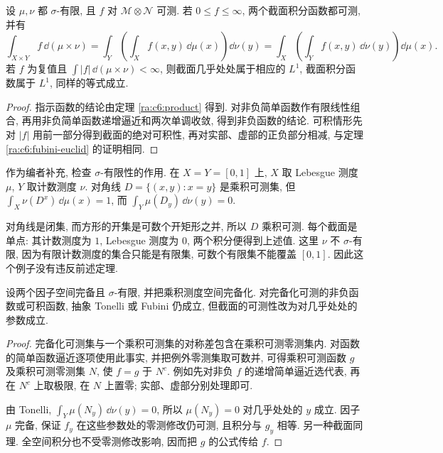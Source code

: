 \begin{theorem}\label{ra:c6:abstract}
设 $\mu,\nu$ 都 $\sigma$-有限, 且 $f$ 对 $\mathcal M\otimes\mathcal N$ 可测.
若 $0\le f\le\infty$, 两个截面积分函数都可测, 并有
\[
 \int_{X\times Y}f\,\dd(\mu\times\nu)
 =\int_Y\left(\int_Xf(x,y)\,\dd\mu(x)\right)\dd\nu(y)
 =\int_X\left(\int_Yf(x,y)\,\dd\nu(y)\right)\dd\mu(x).
\]
若 $f$ 为复值且 $\int|f|\,\dd(\mu\times\nu)<\infty$, 则截面几乎处处属于相应的 $L^1$, 截面积分函数属于 $L^1$, 同样的等式成立.
\end{theorem}
\begin{proof}
指示函数的结论由定理 \ref{ra:c6:product} 得到. 对非负简单函数作有限线性组合, 再用非负简单函数递增逼近和两次单调收敛, 得到非负函数的结论. 可积情形先对 $|f|$ 用前一部分得到截面的绝对可积性, 再对实部、虚部的正负部分相减, 与定理 \ref{ra:c6:fubini-euclid} 的证明相同.
\end{proof}

\begin{example}
作为编者补充, 检查 $\sigma$-有限性的作用. 在 $X=Y=[0,1]$ 上, $X$ 取 Lebesgue 测度 $\mu$, $Y$ 取计数测度 $\nu$. 对角线 $D=\{(x,y):x=y\}$ 是乘积可测集, 但
$\int_X\nu(D^x)\,\dd\mu(x)=1$, 而 $\int_Y\mu(D_y)\,\dd\nu(y)=0$.
\end{example}
\begin{solution}
对角线是闭集, 而方形的开集是可数个开矩形之并, 所以 $D$ 乘积可测. 每个截面是单点: 其计数测度为 $1$, Lebesgue 测度为 $0$, 两个积分便得到上述值. 这里 $\nu$ 不 $\sigma$-有限, 因为有限计数测度的集合只能是有限集, 可数个有限集不能覆盖 $[0,1]$. 因此这个例子没有违反前述定理.
\end{solution}


\begin{proposition}[完备乘积上的截面]\label{ra:c6:completion}
设两个因子空间完备且 $\sigma$-有限, 并把乘积测度空间完备化. 对完备化可测的非负函数或可积函数, 抽象 Tonelli 或 Fubini 仍成立, 但截面的可测性改为对几乎处处的参数成立.
\end{proposition}
\begin{proof}
完备化可测集与一个乘积可测集的对称差包含在乘积可测零测集内. 对函数的简单函数逼近逐项使用此事实, 并把例外零测集取可数并, 可得乘积可测函数 $g$ 及乘积可测零测集 $N$, 使 $f=g$ 于 $N^c$. 例如先对非负 $f$ 的递增简单逼近选代表, 再在 $N^c$ 上取极限, 在 $N$ 上置零; 实部、虚部分别处理即可.

由 Tonelli, $\int_Y\mu(N_y)\,\dd\nu(y)=0$, 所以 $\mu(N_y)=0$ 对几乎处处的 $y$ 成立. 因子 $\mu$ 完备, 保证 $f_y$ 在这些参数处的零测修改仍可测, 且积分与 $g_y$ 相等. 另一种截面同理. 全空间积分也不受零测修改影响, 因而把 $g$ 的公式传给 $f$.
\end{proof}

